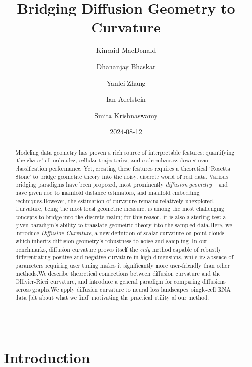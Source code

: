 \documentclass[
  letterpaper,
  DIV=11,
  numbers=noendperiod]{scrartcl}
\title{Bridging Diffusion Geometry to Curvature}
\author{Kincaid MacDonald \and Dhananjay Bhaskar \and Yanlei
Zhang \and Ian Adelstein \and Smita Krishnaswamy}
\date{2024-08-12}
\theoremstyle{plain}
\theoremstyle{definition}
\theoremstyle{plain}
\theoremstyle{plain}
\theoremstyle{definition}
\theoremstyle{remark}
\begin{document}
\maketitle
\begin{abstract}
Modeling data geometry has proven a rich source of interpretable
features: quantifying `the shape' of molecules, cellular trajectories,
and code enhances downstream classification performance. Yet, creating
these features requires a theoretical `Rosetta Stone' to bridge
geometric theory into the noisy, discrete world of real data. Various
bridging paradigms have been proposed, most prominently \emph{diffusion
geometry} -- and have given rise to manifold distance estimators, and
manifold embedding techniques.However, the estimation of curvature
remains relatively unexplored. Curvature, being the most local geometric
measure, is among the most challenging concepts to bridge into the
discrete realm; for this reason, it is also a sterling test a given
paradigm's ability to translate geometric theory into the sampled
data.Here, we introduce \emph{Diffusion Curvature}, a new definition of
scalar curvature on point clouds which inherits diffusion geometry's
robustness to noise and sampling. In our benchmarks, diffusion curvature
proves itself the \emph{only} method capable of robustly differentiating
positive and negative curvature in high dimensions, while its absence of
parameters requiring user tuning makes it significantly more
user-friendly than other methods.We describe theoretical connections
between diffusion curvature and the Ollivier-Ricci curvature, and
introduce a general paradigm for comparing diffusions across graphs.We
apply diffusion curvature to neural loss landscapes, single-cell RNA
data {[}bit about what we find{]} motivating the practical utility of
our method.
\end{abstract}
\begin{center}\rule{0.5\linewidth}{0.5pt}\end{center}

\newcommand\Kaly[1]{\textcolor{blue}{Kaly: [[[#1]]]}}

\section{Introduction}\label{introduction}
\end{document}
